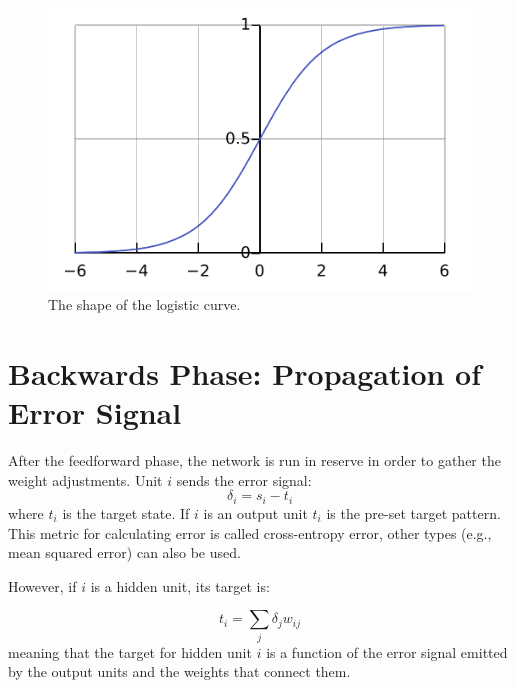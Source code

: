 \documentclass[a4paper,10pt]{article}
\begin{document}
\begin{figure}[hb]
 \centering
 \includegraphics[scale=.5]{fig/Logistic-curve.pdf}
 \caption{The shape of the logistic curve. }
 \label{fig:logistic}
\end{figure}




\section{Backwards Phase: Propagation of Error Signal}
\label{sub:backwards_phase}
After the feedforward phase, the network is run in reserve in order to gather the weight adjustments. Unit $i$ sends the error signal:
\begin{equation}
  \delta_i = s_i - t_i %
\label{eq:bp_error}
\end{equation}
where $t_i$ is the target state. If $i$ is an output unit $t_i$ is the pre-set target pattern. This metric for calculating error is called cross-entropy error, other types (e.g., mean squared error) can also be used.

However, if $i$ is a hidden unit, its target is:

\begin{equation}
\label{eq:ff_targets}
  t_i = \sum_{j} \delta_j w_{ij} 
\end{equation}
meaning that the target for hidden unit $i$ is a function of the error signal emitted by the output units and the weights that connect them. 
\end{document}
